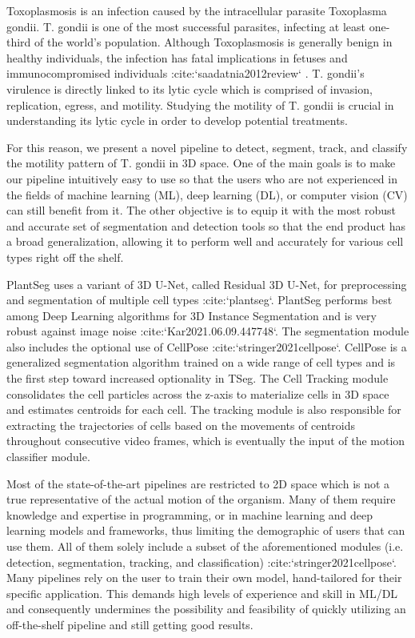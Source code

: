 \documentclass[./dissertation.tex]{subfiles}
\begin{document}
Toxoplasmosis is an infection caused by the intracellular parasite Toxoplasma gondii. T. gondii is one of the most successful parasites, infecting at least one-third of the world's population. Although Toxoplasmosis is generally benign in healthy individuals, the infection has fatal implications in fetuses and immunocompromised individuals :cite:`saadatnia2012review` . T. gondii's virulence is directly linked to its lytic cycle which is comprised of invasion, replication, egress, and motility. Studying the motility of T. gondii is crucial in understanding its lytic cycle in order to develop potential treatments.

For this reason, we present a novel pipeline to detect, segment, track, and classify the motility pattern of T. gondii in 3D space. One of the main goals is to make our pipeline intuitively easy to use so that the users who are not experienced in the fields of machine learning (ML), deep learning (DL), or computer vision (CV) can still benefit from it. The other objective is to equip it with the most robust and accurate set of segmentation and detection tools so that the end product has a broad generalization, allowing it to perform well and accurately for various cell types right off the shelf.

PlantSeg uses a variant of 3D U-Net, called Residual 3D U-Net, for preprocessing and segmentation of multiple cell types :cite:`plantseg`. PlantSeg performs best among Deep Learning algorithms for 3D Instance Segmentation and is very robust against image noise :cite:`Kar2021.06.09.447748`. The segmentation module also includes the optional use of CellPose :cite:`stringer2021cellpose`. CellPose is a generalized segmentation algorithm trained on a wide range of cell types and is the first step toward increased optionality in TSeg. The Cell Tracking module consolidates the cell particles across the z-axis to materialize cells in 3D space and estimates centroids for each cell. The tracking module is also responsible for extracting the trajectories of cells based on the movements of centroids throughout consecutive video frames, which is eventually the input of the motion classifier module.

Most of the state-of-the-art pipelines are restricted to 2D space which is not a true representative of the actual motion of the organism. Many of them require knowledge and expertise in programming, or in machine learning and deep learning models and frameworks, thus limiting the demographic of users that can use them. All of them solely include a subset of the aforementioned modules (i.e. detection, segmentation, tracking, and classification) :cite:`stringer2021cellpose`. Many pipelines rely on the user to train their own model, hand-tailored for their specific application. This demands high levels of experience and skill in ML/DL and consequently undermines the possibility and feasibility of quickly utilizing an off-the-shelf pipeline and still getting good results.
\end{document}

